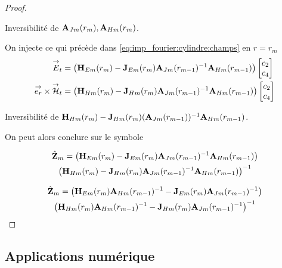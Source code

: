 \begin{proof}
      \begin{TODO}
        Inversibilité de \(\mathbf{A}_{Jm}(r_m), \mathbf{A}_{Hm}(r_m)\).
      \end{TODO}

      On injecte ce qui précède dans \eqref{eq:imp_fourier:cylindre:champs} en \(r = r_{m}\)
      \begin{align}
        {\overset{\rightarrow}{E}}_t &=
        \left(\mathbf{H}_{Em}(r_{m}) - \mathbf{J}_{Em}(r_{m})\mathbf{A}_{Jm}(r_{m-1})^{-1}\mathbf{A}_{Hm}(r_{m-1})\right)
        \begin{bmatrix}
          c_2 \\
          c_4
        \end{bmatrix}
        \\
        {\overset{\rightarrow}{e_r}}\times{\overset{\rightarrow}{\mathcal{H}}}_t &=
        \left(\mathbf{H}_{Hm}(r_{m}) - \mathbf{J}_{Hm}(r_{m})\mathbf{A}_{Jm}(r_{m-1})^{-1}\mathbf{A}_{Hm}(r_{m-1}) \right)
        \begin{bmatrix}
          c_2 \\
          c_4
        \end{bmatrix}
      \end{align}

      \begin{TODO}
        Inversibilité de \(\mathbf{H}_{Hm}(r_m) - \mathbf{J}_{Hm}(r_m)(\mathbf{A}_{Jm}(r_{m-1}))^{-1}\mathbf{A}_{Hm}(r_{m-1})\).
      \end{TODO}

      On peut alors conclure sur le symbole

      \begin{multline}
        \hat {\mathbf{Z}}_{m} =
          \left(\mathbf{H}_{Em}(r_m) - \mathbf{J}_{Em}(r_m)\mathbf{A}_{Jm}(r_{m-1})^{-1}\mathbf{A}_{Hm}(r_{m-1})\right) \\
          \left(\mathbf{H}_{Hm}(r_m) - \mathbf{J}_{Hm}(r_m)\mathbf{A}_{Jm}(r_{m-1})^{-1}\mathbf{A}_{Hm}(r_{m-1})\right)^{-1}
      \end{multline}

      \begin{multline}
        \hat {\mathbf{Z}}_{m} =
          \left(\mathbf{H}_{Em}(r_m)\mathbf{A}_{Hm}(r_{m-1})^{-1} - \mathbf{J}_{Em}(r_m)\mathbf{A}_{Jm}(r_{m-1})^{-1}\right) \\
          \left(\mathbf{H}_{Hm}(r_m)\mathbf{A}_{Hm}(r_{m-1})^{-1} - \mathbf{J}_{Hm}(r_m)\mathbf{A}_{Jm}(r_{m-1})^{-1}\right)^{-1}
      \end{multline}

    \end{proof}

  \subsection{Applications numérique}

